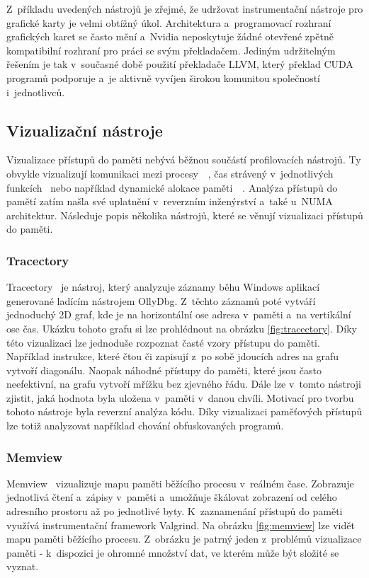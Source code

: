 Z~příkladu uvedených nástrojů je zřejmé, že udržovat instrumentační nástroje pro grafické karty je velmi obtížný úkol. Architektura a~programovací rozhraní grafických karet se často mění a~Nvidia neposkytuje žádné otevřené zpětně kompatibilní rozhraní pro práci se svým překladačem. Jediným udržitelným řešením je tak v~současné době použití překladače LLVM, který překlad CUDA programů podporuje a~je aktivně vyvíjen širokou komunitou společností i~jednotlivců.

\subsection{Vizualizační nástroje}
Vizualizace přístupů do paměti nebývá běžnou součástí profilovacích nástrojů. Ty obvykle vizualizují komunikaci mezi procesy~\cite{tau}~\cite{vampir}, čas strávený v~jednotlivých funkcích~\cite{flamegraph} nebo například dynamické alokace paměti~\cite{gcspy}~\cite{dynmem-visualisation}. Analýza přístupů do pamětí zatím našla své uplatnění v~reverzním inženýrství a~také u~NUMA architektur. Následuje popis několika nástrojů, které se věnují vizualizaci přístupů do paměti.

\subsubsection*{Tracectory}
Tracectory~\cite{tracectory} je nástroj, který analyzuje záznamy běhu Windows aplikací generované ladícím nástrojem OllyDbg. Z~těchto záznamů poté vytváří jednoduchý 2D graf, kde je na horizontální ose adresa v~paměti a~na vertikální ose čas. Ukázku tohoto grafu si lze prohlédnout na obrázku \ref{fig:tracectory}. Díky této vizualizaci lze jednoduše rozpoznat časté vzory přístupu do paměti. Například instrukce, které čtou či zapisují z~po sobě jdoucích adres na grafu vytvoří diagonálu. Naopak náhodné přístupy do paměti, které jsou často neefektivní, na grafu vytvoří mřížku bez zjevného řádu. Dále lze v~tomto nástroji zjistit, jaká hodnota byla uložena v~paměti v~danou chvíli. Motivací pro tvorbu tohoto nástroje byla reverzní analýza kódu. Díky vizualizaci paměťových přístupů lze totiž analyzovat například chování obfuskovaných programů.

\subsubsection*{Memview}
Memview~\cite{memview} vizualizuje mapu paměti běžícího procesu v~reálném čase. Zobrazuje jednotlivá čtení a~zápisy v~paměti a~umožňuje škálovat zobrazení od celého adresního prostoru až po jednotlivé byty. K~zaznamenání přístupů do paměti využívá instrumentační framework Valgrind. Na obrázku \ref{fig:memview} lze vidět mapu paměti běžícího procesu. Z~obrázku je patrný jeden z~problémů vizualizace paměti - k~dispozici je ohromné množství dat, ve kterém může být složité se vyznat.

